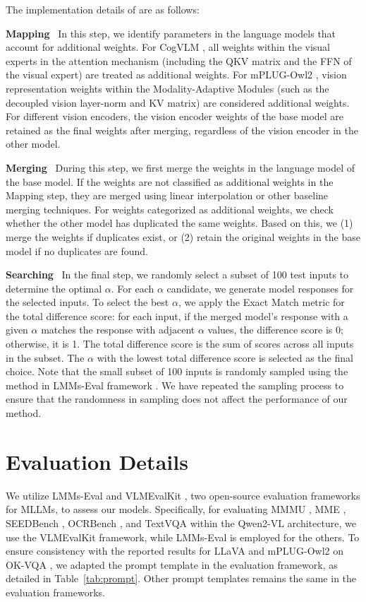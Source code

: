 The implementation details of \ours are as follows:

\noindent\textbf{Mapping} \  In this step, we identify parameters in the language models that account for additional weights. For CogVLM \cite{cogvlm}, all weights within the visual experts in the attention mechanism (including the QKV matrix and the FFN of the visual expert) are treated as additional weights. For mPLUG-Owl2 \cite{mplugowl2}, vision representation weights within the Modality-Adaptive Modules (such as the decoupled vision layer-norm and KV matrix) are considered additional weights. For different vision encoders, the vision encoder weights of the base model are retained as the final weights after merging, regardless of the vision encoder in the other model.

\noindent\textbf{Merging} \  During this step, we first merge the weights in the language model of the base model. If the weights are not classified as additional weights in the Mapping step, they are merged using linear interpolation or other baseline merging techniques. For weights categorized as additional weights, we check whether the other model has duplicated the same weights. Based on this, we (1) merge the weights if duplicates exist, or (2) retain the original weights in the base model if no duplicates are found.

\noindent\textbf{Searching} \  In the final step, we randomly select a subset of 100 test inputs to determine the optimal $\alpha$. For each $\alpha$ candidate, we generate model responses for the selected inputs. To select the best $\alpha$, we apply the Exact Match metric for the total difference score: for each input, if the merged model's response with a given $\alpha$ matches the response with adjacent $\alpha$ values, the difference score is 0; otherwise, it is 1. The total difference score is the sum of scores across all inputs in the subset. The $\alpha$ with the lowest total difference score is selected as the final choice. Note that the small subset of 100 inputs is randomly sampled using the method in LMMs-Eval framework \cite{lmms-eval}. We have repeated the sampling process to ensure that the randomness in sampling does not affect the performance of our method.

\section{Evaluation Details}
\label{appendix:eval}

We utilize LMMs-Eval \cite{lmms-eval} and VLMEvalKit \cite{vlmevalkit}, two open-source evaluation frameworks for MLLMs, to assess our models. Specifically, for evaluating MMMU \cite{mmmu}, MME \cite{mme}, SEEDBench \cite{seedbench}, OCRBench \cite{ocrbench}, and TextVQA \cite{textvqa} within the Qwen2-VL \cite{qwen2-vl} architecture, we use the VLMEvalKit framework, while LMMs-Eval is employed for the others. To ensure consistency with the reported results for LLaVA and mPLUG-Owl2 on OK-VQA \cite{okvqa}, we adapted the prompt template in the evaluation framework, as detailed in Table~\ref{tab:prompt}. Other prompt templates remains the same in the evaluation frameworks.

